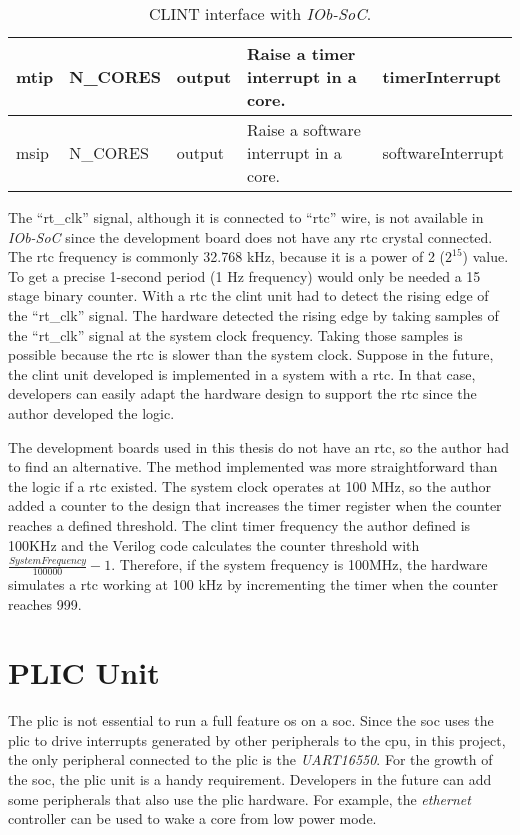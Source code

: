 \begin{table}[!ht]
{\begin{tabular}{|l|l|l|l|l|}
  mtip          & N\_CORES       & output             & Raise a timer interrupt in a core.                                                                  & timerInterrupt                       \\ \hline
  msip          & N\_CORES       & output             & Raise a software interrupt in a core.                                                               & softwareInterrupt                    \\ \hline
  \end{tabular}%
  }
  \caption{CLINT interface with \textit{IOb-SoC}.}
  \label{tab:clint_signals}
\end{table}

The \enquote{rt\_clk} signal, although it is connected to \enquote{rtc} wire, is not available in \textit{IOb-SoC} since the development board does not have any \acrfull{rtc} crystal connected. The \acrshort{rtc} frequency is commonly 32.768 kHz, because it is a power of 2 ($2^15$) value. To get a precise 1-second period (1 Hz frequency) would only be needed a 15 stage binary counter. With a \acrshort{rtc} the \acrshort{clint} unit had to detect the rising edge of the \enquote{rt\_clk} signal. The hardware detected the rising edge by taking samples of the \enquote{rt\_clk} signal at the system clock frequency. Taking those samples is possible because the \acrshort{rtc} is slower than the system clock. Suppose in the future, the \acrshort{clint} unit developed is implemented in a system with a \acrshort{rtc}. In that case, developers can easily adapt the hardware design to support the \acrshort{rtc} since the author developed the logic.

The development boards used in this thesis do not have an \acrshort{rtc}, so the author had to find an alternative. The method implemented was more straightforward than the logic if a \acrshort{rtc} existed. The system clock operates at 100 MHz, so the author added a counter to the design that increases the timer register when the counter reaches a defined threshold. The \acrshort{clint} timer frequency the author defined is 100KHz and the Verilog code calculates the counter threshold with $\frac{SystemFrequency}{100000}-1$. Therefore, if the system frequency is 100MHz, the hardware simulates a \acrshort{rtc} working at 100 kHz by incrementing the timer when the counter reaches 999.

\section{PLIC Unit}
\label{section:plic}
The \acrshort{plic} is not essential to run a full feature \acrfull{os} on a \acrfull{soc}. Since the \acrshort{soc} uses the \acrshort{plic} to drive interrupts generated by other peripherals to the \acrshort{cpu}, in this project, the only peripheral connected to the \acrshort{plic} is the \textit{UART16550}. For the growth of the \acrshort{soc}, the \acrshort{plic} unit is a handy requirement. Developers in the future can add some peripherals that also use the \acrshort{plic} hardware. For example, the \textit{ethernet} controller can be used to wake a core from low power mode.

